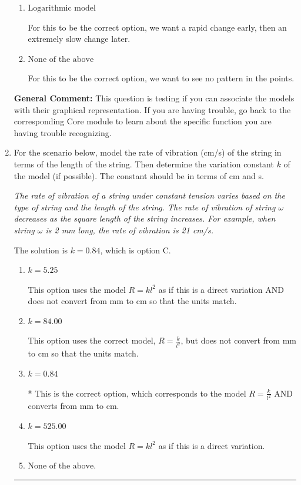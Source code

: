 \documentclass{extbook}[14pt]
\newcommand{\litem}[1]{\item #1

\rule{\textwidth}{0.4pt}}
\begin{document}
\begin{enumerate}
{\begin{enumerate}[label=\Alph*.]
For this to be the correct option, we want an extremely slow change early, then a rapid change later.
\item \( \text{Logarithmic model} \)

For this to be the correct option, we want a rapid change early, then an extremely slow change later.
\item \( \text{None of the above} \)

For this to be the correct option, we want to see no pattern in the points.
\end{enumerate}

\textbf{General Comment:} This question is testing if you can associate the models with their graphical representation. If you are having trouble, go back to the corresponding Core module to learn about the specific function you are having trouble recognizing.
}
\litem{
For the scenario below, model the rate of vibration (cm/s) of the string in terms of the length of the string. Then determine the variation constant $k$ of the model (if possible). The constant should be in terms of cm and s.

\begin{center}
    \textit{ The rate of vibration of a string under constant tension varies based on the type of string and the length of the string. The rate of vibration of string $\omega$ decreases as the square length of the string increases. For example, when string $\omega$ is 2 mm long, the rate of vibration is 21 cm/s. }
\end{center}
The solution is \( k = 0.84 \), which is option C.\begin{enumerate}[label=\Alph*.]
\item \( k = 5.25 \)

This option uses the model $R = kl^{2}$ as if this is a direct variation AND does not convert from mm to cm so that the units match.
\item \( k = 84.00 \)

This option uses the correct model, $R = \frac{k}{l^{2}}$, but does not convert from mm to cm so that the units match.
\item \( k = 0.84 \)

* This is the correct option, which corresponds to the model $R = \frac{k}{l^{2}}$ AND converts from mm to cm.
\item \( k = 525.00 \)

This option uses the model $R = kl^{2}$ as if this is a direct variation.
\item \( \text{None of the above.} \)


\end{enumerate}}
\end{enumerate}
\end{document}

